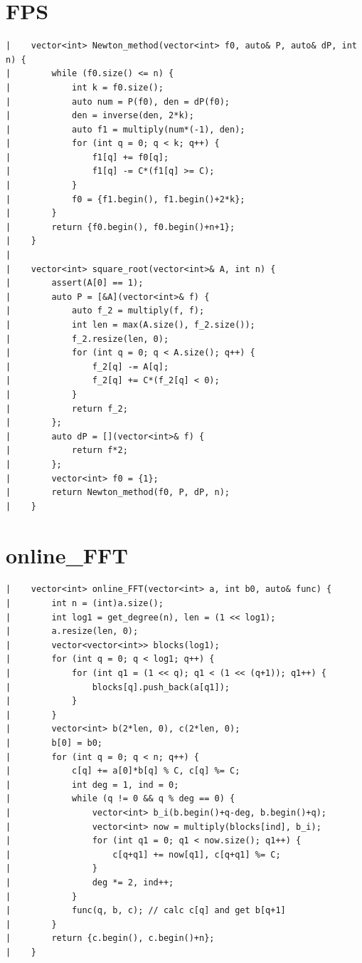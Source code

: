 \documentclass[a4paper, 10pt]{article}
\begin{document}
\begin{center}
\section*{FPS}
\begin{verbatim}
|    vector<int> Newton_method(vector<int> f0, auto& P, auto& dP, int n) {
|        while (f0.size() <= n) {
|            int k = f0.size();
|            auto num = P(f0), den = dP(f0);
|            den = inverse(den, 2*k);
|            auto f1 = multiply(num*(-1), den);
|            for (int q = 0; q < k; q++) {
|                f1[q] += f0[q];
|                f1[q] -= C*(f1[q] >= C);
|            }
|            f0 = {f1.begin(), f1.begin()+2*k};
|        }
|        return {f0.begin(), f0.begin()+n+1};
|    }
|    
|    vector<int> square_root(vector<int>& A, int n) {
|        assert(A[0] == 1);
|        auto P = [&A](vector<int>& f) {
|            auto f_2 = multiply(f, f);
|            int len = max(A.size(), f_2.size());
|            f_2.resize(len, 0);
|            for (int q = 0; q < A.size(); q++) {
|                f_2[q] -= A[q];
|                f_2[q] += C*(f_2[q] < 0);
|            }
|            return f_2;
|        };
|        auto dP = [](vector<int>& f) {
|            return f*2;
|        };
|        vector<int> f0 = {1};
|        return Newton_method(f0, P, dP, n);
|    }
\end{verbatim}

\section*{online\_FFT}
\begin{verbatim}
|    vector<int> online_FFT(vector<int> a, int b0, auto& func) {
|        int n = (int)a.size();
|        int log1 = get_degree(n), len = (1 << log1);
|        a.resize(len, 0);
|        vector<vector<int>> blocks(log1);
|        for (int q = 0; q < log1; q++) {
|            for (int q1 = (1 << q); q1 < (1 << (q+1)); q1++) {
|                blocks[q].push_back(a[q1]);
|            }
|        }
|        vector<int> b(2*len, 0), c(2*len, 0);
|        b[0] = b0;
|        for (int q = 0; q < n; q++) {
|            c[q] += a[0]*b[q] % C, c[q] %= C;
|            int deg = 1, ind = 0;
|            while (q != 0 && q % deg == 0) {
|                vector<int> b_i(b.begin()+q-deg, b.begin()+q);
|                vector<int> now = multiply(blocks[ind], b_i);
|                for (int q1 = 0; q1 < now.size(); q1++) {
|                    c[q+q1] += now[q1], c[q+q1] %= C;
|                }
|                deg *= 2, ind++;
|            }
|            func(q, b, c); // calc c[q] and get b[q+1]
|        }
|        return {c.begin(), c.begin()+n};
|    }
\end{verbatim}


\end{center}
\end{document}
